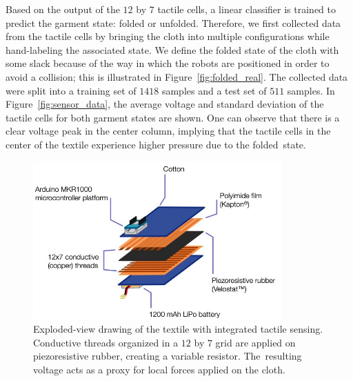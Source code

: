 \documentclass[\home/main.tex]{subfiles}
\begin{document}
Based on the output of the $12$ by $7$ tactile cells, a linear classifier is trained to predict the garment state: folded or unfolded. Therefore, we first collected data from the tactile cells by bringing the cloth into multiple configurations while hand-labeling the associated state. We define the folded state of the cloth with some slack because of the way in which the robots are positioned in order to avoid a collision; this is illustrated in Figure~\ref{fig:folded_real}. The collected data were split into a training set of $1418$ samples and a test set of $511$ samples. In Figure~\ref{fig:sensor_data}, the average voltage and standard deviation of the tactile cells for both garment states are shown. One can observe that there is a clear voltage peak in the center column, implying that the tactile cells in the center of the textile experience higher pressure due to the folded~state.
\begin{figure}[H]
\centering
\includegraphics[width=0.85\textwidth, keepaspectratio]{figures/textile_overview.jpg}
\caption{Exploded-view drawing of the textile with integrated tactile sensing. Conductive threads organized in a $12$ by $7$ grid are applied on piezoresistive rubber, creating a variable resistor. The~resulting voltage acts as a proxy for local forces applied on the cloth. } %
\label{fig:textile_scheme}
\end{figure}
\unskip
\end{document}
